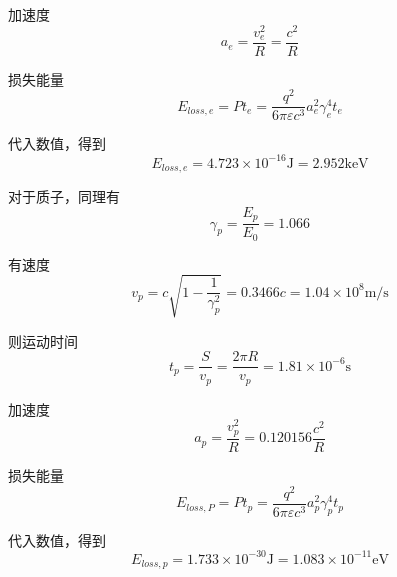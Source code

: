 \documentclass{article}
\begin{document}
加速度$$ a_e = \frac{v_e^2}{R} = \frac{c^2}{R} $$

损失能量 $$ E_{loss, e} = Pt_e = \frac{q^2}{6\pi\varepsilon c^3}a_e^2\gamma_e^4 t_e $$

代入数值，得到 $$ E_{loss, e} = 4.723 \times {10}^{-16} \text{J} = 2.952 \text{keV} $$

对于质子，同理有$$\gamma_p = \frac{E_p}{E_0} = 1.066 $$

有速度$$ v_p = c \sqrt{1-\frac{1}{\gamma_p^2}} = 0.3466c = 1.04 \times {10}^{8} \text{m/s} $$

则运动时间 $$t_p = \frac{S}{v_p} = \frac{2\pi R}{v_p} = 1.81 \times {10}^{-6} \text{s}$$

加速度$$ a_p = \frac{v_p^2}{R} = 0.120156 \frac{c^2}{R} $$

损失能量 $$ E_{loss, P} = Pt_p = \frac{q^2}{6\pi\varepsilon c^3}a_p^2\gamma_p^4 t_p $$

代入数值，得到 $$ E_{loss, p} = 1.733 \times {10}^{-30} \text{J} = 1.083 \times 10^{-11} \text{eV} $$
\end{document}
